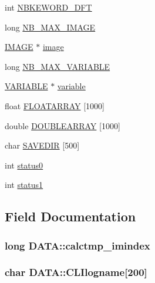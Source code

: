 \begin{DoxyCompactItemize}
\item 
int \hyperlink{structDATA_aece2a33a30b5f15d8250cee2a8f0aa02}{N\+B\+K\+E\+W\+O\+R\+D\+\_\+\+D\+F\+T}
\item 
long \hyperlink{structDATA_a2522406c33b8f890757cfbd8db858f77}{N\+B\+\_\+\+M\+A\+X\+\_\+\+I\+M\+A\+G\+E}
\item 
\hyperlink{structIMAGE}{I\+M\+A\+G\+E} $\ast$ \hyperlink{structDATA_aafd2755d1c0845d9f671d42c916469ed}{image}
\item 
long \hyperlink{structDATA_adbdde6182898eaf675b02e337dc93750}{N\+B\+\_\+\+M\+A\+X\+\_\+\+V\+A\+R\+I\+A\+B\+L\+E}
\item 
\hyperlink{structVARIABLE}{V\+A\+R\+I\+A\+B\+L\+E} $\ast$ \hyperlink{structDATA_a38336f0ef793c2aef2a6f3a20e3e361b}{variable}
\item 
float \hyperlink{structDATA_a58210ca81311d78d220027755351f8b8}{F\+L\+O\+A\+T\+A\+R\+R\+A\+Y} \mbox{[}1000\mbox{]}
\item 
double \hyperlink{structDATA_a15076d931e1bc151a4a9933e09f344b1}{D\+O\+U\+B\+L\+E\+A\+R\+R\+A\+Y} \mbox{[}1000\mbox{]}
\item 
char \hyperlink{structDATA_a883b88f5c5cca024bfc4240cda302dd7}{S\+A\+V\+E\+D\+I\+R} \mbox{[}500\mbox{]}
\item 
int \hyperlink{structDATA_a14eafa363f5cd5dd7ff9ca0744029565}{status0}
\item 
int \hyperlink{structDATA_acc1a46fa384934e24a89660d8d0c9f7a}{status1}
\end{DoxyCompactItemize}


\subsection{Field Documentation}
\hypertarget{structDATA_a11b6d226ab6612bc5a418abb89b56feb}{}
\subsubsection[{calctmp\+\_\+imindex}]{\setlength{\rightskip}{0pt plus 5cm}long D\+A\+T\+A\+::calctmp\+\_\+imindex}\label{structDATA_a11b6d226ab6612bc5a418abb89b56feb}
\hypertarget{structDATA_aa491474d93756c181862fb907c777b78}{}
\subsubsection[{C\+L\+Ilogname}]{\setlength{\rightskip}{0pt plus 5cm}char D\+A\+T\+A\+::\+C\+L\+Ilogname\mbox{[}200\mbox{]}}\label{structDATA_aa491474d93756c181862fb907c777b78}
\hypertarget{structDATA_abfc40a5bf0093716bcc793aca3ec678c}{}
